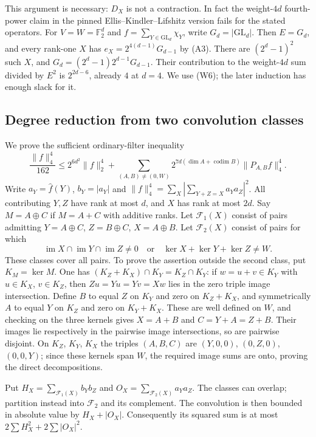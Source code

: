 This argument is necessary: $D_X$ is not a contraction. In fact the
weight-$4d$ fourth-power claim in the pinned Ellis--Kindler--Lifshitz
version fails for the stated operators. For $V=W=\mathbb F_2^d$ and
$f=\sum_{Y\in\mathrm{GL}_d}\chi_Y$, write $G_d=|\mathrm{GL}_d|$.
Then $E=G_d$, and every rank-one $X$ has
$e_X=2^{4(d-1)}G_{d-1}$ by (A3). There are $(2^d-1)^2$ such $X$, and
$G_d=(2^d-1)2^{d-1}G_{d-1}$. Their contribution to the weight-$4d$
sum divided by $E^2$ is $2^{2d-6}$, already $4$ at $d=4$.
We use (W6); the later induction has enough slack for it.

\subsection{Degree reduction from two convolution classes}
We prove the sufficient ordinary-filter inequality
\[
 \frac{\|f\|_4^4}{162}\le2^{6d^2}\|f\|_2^4+
 \sum_{(A,B)\ne(0,W)}2^{7d(\dim A+\operatorname{codim}B)}
                       \|P_{A,B}f\|_4^4.             \tag{DR6}
\]
Write $a_Y=\widehat f(Y)$, $b_Y=|a_Y|$ and
$\|f\|_4^4=\sum_X|\sum_{Y+Z=X}a_Ya_Z|^2$.
All contributing $Y,Z$ have rank at most $d$, and $X$ has rank at most
$2d$. Say $M=A\oplus C$ if $M=A+C$ with additive ranks.
Let $\mathcal F_1(X)$ consist of pairs admitting
$Y=A\oplus C$, $Z=B\oplus C$, $X=A\oplus B$.
Let $\mathcal F_2(X)$ consist of pairs for which
\[
 \operatorname{im}X\cap\operatorname{im}Y\cap\operatorname{im}Z\ne0
 \quad\text{or}\quad
 \ker X+\ker Y+\ker Z\ne W.
\]
These classes cover all pairs. To prove the assertion outside the second
class, put $K_M=\ker M$. One has
$(K_Z+K_X)\cap K_Y=K_Z\cap K_Y$: if $w=u+v\in K_Y$ with
$u\in K_X$, $v\in K_Z$, then $Zu=Yu=Yv=Xw$ lies in the zero triple
image intersection. Define $B$ to equal $Z$ on $K_Y$ and zero on
$K_Z+K_X$, and symmetrically $A$ to equal $Y$ on $K_Z$ and zero on
$K_Y+K_X$. These are well defined on $W$, and checking on the three
kernels gives $X=A+B$ and $C=Y+A=Z+B$. Their images lie respectively in
the pairwise image intersections, so are pairwise disjoint. On $K_Z$,
$K_Y$, $K_X$ the triples $(A,B,C)$ are $(Y,0,0)$, $(0,Z,0)$,
$(0,0,Y)$; since these kernels span $W$, the required image sums are
onto, proving the direct decompositions.

Put $H_X=\sum_{\mathcal F_1(X)}b_Yb_Z$ and
$O_X=\sum_{\mathcal F_2(X)}a_Ya_Z$. The classes can overlap; partition
instead into $\mathcal F_2$ and its complement. The convolution is then
bounded in absolute value by $H_X+|O_X|$. Consequently its squared sum
is at most $2\sum H_X^2+2\sum|O_X|^2$.

